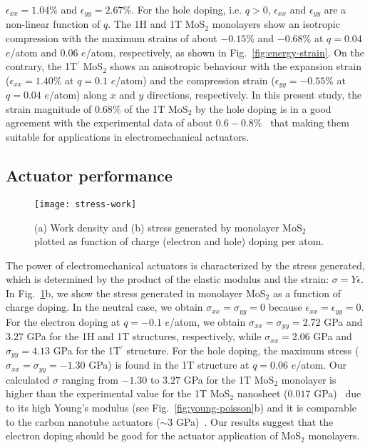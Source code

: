 \documentclass[12pt]{iopart}
\begin{document}
$\epsilon_{xx}=1.04$\% and $\epsilon_{yy}=2.67$\%.  For the hole
doping, i.e. $q>0$, $\epsilon_{xx}$ and $\epsilon_{yy}$ are a
non-linear function of $q$.  The 1H and 1T MoS$_2$ monolayers show an
isotropic compression with the maximum strains of about $-0.15$\% and
$-0.68$\% at $q=0.04$ $e$/atom and $0.06$ $e$/atom, respectively, as
shown in Fig.~\ref{fig:energy-strain}.  On the contrary, the
1T$^\prime$ MoS$_2$ shows an anisotropic behaviour with the expansion
strain ($\epsilon_{xx}=1.40$\% at $q=0.1$ $e$/atom) and the
compression strain ($\epsilon_{yy}=-0.55$\% at $q=0.04$ $e$/atom)
along $x$ and $y$ directions, respectively.  In this present study,
the strain magnitude of $0.68$\% of the 1T MoS$_2$ by the hole doping
is in a good agreement with the experimental data of about
$0.6-0.8$\%~\cite{acerce2017metallic} that making them suitable for
applications in electromechanical actuators.

\subsection{Actuator performance}

\begin{figure}[t!]
  \centering \texttt{[image: stress-work]}
  \caption{\label{fig:stress}(a) Work density and (b) stress generated
    by monolayer MoS$_2$ plotted as function of charge (electron and
    hole) doping per atom.}
\end{figure}

The power of electromechanical actuators is characterized by the
stress generated, which is determined by the product of the elastic
modulus and the strain: $\sigma=Y\epsilon$.  In
Fig.~\ref{fig:stress}b, we show the stress generated in monolayer
MoS$_2$ as a function of charge doping. In the neutral case, we obtain
$\sigma_{xx}=\sigma_{yy}=0$ because $\epsilon_{xx}=\epsilon_{yy}=0$.
For the electron doping at $q=-0.1$ $e$/atom, we obtain
$\sigma_{xx}=\sigma_{yy}=2.72$ GPa and $3.27$ GPa for the 1H and 1T
structures, respectively, while $\sigma_{xx}=2.06$ GPa and
$\sigma_{yy}=4.13$ GPa for the 1T$^\prime$ structure.  For the hole
doping, the maximum stress ($\sigma_{xx}=\sigma_{yy}=-1.30$ GPa) is
found in the 1T structure at $q=0.06$ $e$/atom.  Our calculated
$\sigma$ ranging from $-1.30$ to $3.27$ GPa for the 1T MoS$_2$
monolayer is higher than the experimental value for the 1T MoS$_2$
nanosheet ($0.017$ GPa)~\cite{acerce2017metallic} due to its high
Young's modulus (see Fig.~\ref{fig:young-poisson}b) and it is
comparable to the carbon nanotube actuators ($\sim3$
GPa)~\cite{qu2008carbon,hung2017charge}. Our results suggest that the
electron doping should be good for the actuator application of MoS$_2$
monolayers.
\end{document}

